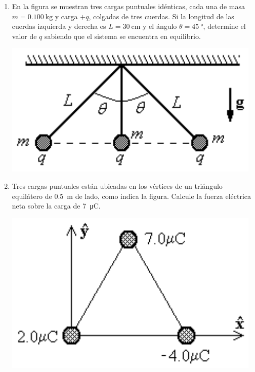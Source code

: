 \documentclass[11pt,spanish,a4paper]{article}
\begin{document}
\begin{enumerate}
	\item \begin{minipage}[t][3cm]{0.65\textwidth}
 		En la figura se muestran tres cargas puntuales idénticas, cada una de masa \(m = \SI{0.100}{\kilogram}\) y carga \(+q\), colgadas de tres cuerdas. 
		Si la longitud de las cuerdas izquierda y derecha es \(L = \SI{30}{\centi\metre}\) y el ángulo \(\theta = \SI{45}{\degree}\), determine el valor de \(q\) sabiendo que el sistema se encuentra en equilibrio.
    \end{minipage}
    \begin{minipage}[c][1em][t]{0.3\textwidth}
		\includegraphics[width=\textwidth]{p1e02}
    \end{minipage}


	\item \begin{minipage}[t][3.5cm]{0.65\textwidth}
		Tres cargas puntuales están ubicadas en los vértices de un triángulo equilátero de \SI{0.5}{\metre} de lado, como indica la figura.
		Calcule la fuerza eléctrica neta sobre la carga de \SI{7}{\micro\coulomb}.
    \end{minipage}
    \begin{minipage}[c][1em][t]{0.3\textwidth}
		\includegraphics[width=\textwidth]{p1e03}
    \end{minipage}



\end{enumerate}
\end{document}
